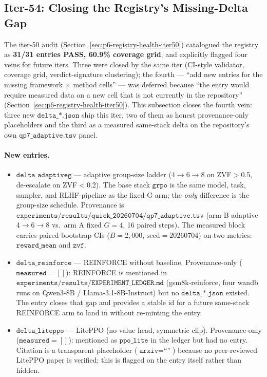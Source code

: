 \subsection{Iter-54: Closing the Registry's Missing-Delta Gap}
\label{sec:p6-missing-deltas}

The iter-50 audit (Section~\ref{sec:p6-registry-health-iter50})
catalogued the registry as \textbf{31/31 entries PASS, 60.9\%
coverage grid}, and explicitly flagged four veins for future iters.
Three were closed by the same iter (CI-style validator, coverage grid,
verdict-signature clustering); the fourth --- ``add new entries for
the missing framework $\times$ method cells'' --- was deferred because
``the entry would require measured data on a new cell that is not
currently in the repository'' (Section~\ref{sec:p6-registry-health-iter50}).
This subsection
closes the fourth vein: three new $\texttt{delta\_*.json}$ ship this
iter, two of them as honest provenance-only placeholders and the
third as a measured same-stack delta on the repository's own
$\texttt{qp7\_adaptive.tsv}$ panel.

\paragraph{New entries.}
\begin{itemize}
\item $\texttt{delta\_adaptiveg}$ --- adaptive group-size ladder
(4$\to$6$\to$8 on ZVF$>$0.5, de-escalate on ZVF$<$0.2). The base
stack $\texttt{grpo}$ is the same model, task, sampler, and
RLHF-pipeline as the fixed-G arm; the \emph{only} difference is the
group-size schedule. Provenance is
$\texttt{experiments/results/quick\_20260704/qp7\_adaptive.tsv}$
(arm B adaptive 4$\to$6$\to$8 vs.\ arm A fixed $G=4$, 16 paired
steps). The measured block carries paired bootstrap CIs
($B=2{,}000$, $\text{seed}=20260704$) on two metrics:
$\texttt{reward\_mean}$ and $\texttt{zvf}$.
\item $\texttt{delta\_reinforce}$ --- REINFORCE without baseline.
Provenance-only ($\texttt{measured}=[]$): REINFORCE is mentioned in
$\texttt{experiments/results/EXPERIMENT\_LEDGER.md}$ (gsm8k-reinforce,
four wandb runs on Qwen3-8B / Llama-3.1-8B-Instruct) but no
$\texttt{delta\_*.json}$ existed. The entry closes that gap and
provides a stable id for a future same-stack REINFORCE arm to land
in without re-minting the entry.
\item $\texttt{delta\_liteppo}$ --- LitePPO (no value head, symmetric
clip). Provenance-only ($\texttt{measured}=[]$): mentioned as
$\texttt{ppo\_lite}$ in the ledger but had no entry. Citation is a
transparent placeholder ($\texttt{arxiv}=\text{``''}$) because no
peer-reviewed LitePPO paper is verified; this is flagged on the
entry itself rather than hidden.
\end{itemize}

